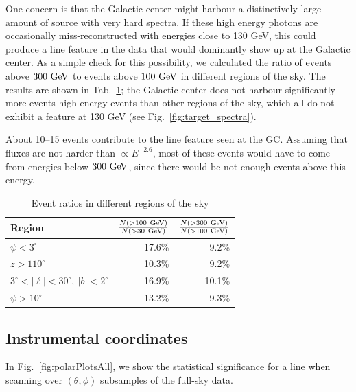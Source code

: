 \documentclass[aps,twocolumn,prd,superscriptaddress,showpacs,nofootinbib,fixfloat]{revtex4}
\newcommand{\GeV}{{\rm ~GeV}}
\begin{document}
One concern is that the Galactic center might harbour a distinctively large
amount of source with very hard spectra. If these high energy photons are
occasionally miss-reconstructed with energies close to 130 GeV, this could
produce a line feature in the data that would dominantly show up at the
Galactic center. As a simple check for this possibility, we calculated the
ratio of events above $300\GeV$ to events above $100\GeV$ in different regions
of the sky. The results are shown in Tab.~\ref{tab:eventRatios}; the Galactic
center does not harbour significantly more events high energy events than
other regions of the sky, which all do not exhibit a feature at 130 GeV (see
Fig.~\ref{fig:target_spectra}). 

About 10--15 events contribute to the line feature seen at the GC. Assuming
that fluxes are not harder than $\propto E^{-2.6}$, most of these events would
have to come from energies below $300\GeV$, since there would be not enough
events above this energy.

\begin{table}
  \begin{tabular}{lrr}
    \hline
    Region & $\frac{N(>100\GeV)}{N(>30\GeV)}$ & $\frac{N(>300\GeV)}{N(>100\GeV)}$\\
    \hline
    $\psi<3^\circ$ & 17.6\% & 9.2\% \\
    $z>110^\circ$  & 10.3\% & 9.2\% \\
    $3^\circ < |\ell| < 30^\circ,\ |b|<2^\circ$ & 16.9\% & 10.1\% \\
    $\psi>10^\circ$ & 13.2\% & 9.3\% \\
    \hline
  \end{tabular}
  \caption{Event ratios in different regions of the sky}
  \label{tab:eventRatios}
\end{table}

\subsection{Instrumental coordinates}
In Fig.~\ref{fig:polarPlotsAll}, we show the statistical significance for a
line when scanning over $(\theta, \phi)$ subsamples of the full-sky data.
\end{document}
